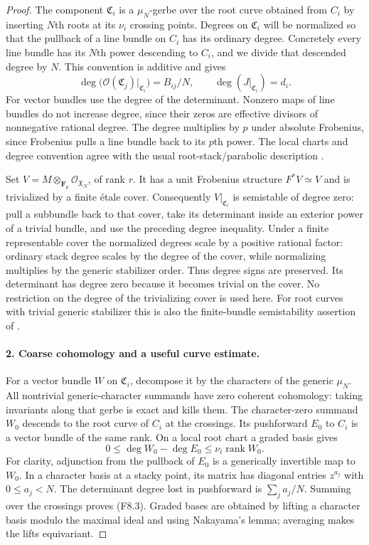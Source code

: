 \begin{proof}
The component $\mathfrak C_i$ is a $\mu_N$-gerbe over the root
curve obtained from $C_i$ by inserting $N$th roots at its $\nu_i$
crossing points. Degrees on $\mathfrak C_i$ will be normalized
so that the pullback of a line bundle on $C_i$ has its ordinary
degree. Concretely every line bundle has its $N$th power descending
to $C_i$, and we divide that descended degree by $N$. This convention
is additive and gives
\[
 \deg\bigl(\mathcal O(\mathfrak C_j)|_{\mathfrak C_i}\bigr)
        =B_{ij}/N,
 \qquad \deg(J|_{\mathfrak C_i})=d_i.
 \tag{F8.2}
\]
For vector bundles use the degree of the determinant. Nonzero
maps of line bundles do not increase degree, since their zeros
are effective divisors of nonnegative rational degree.
The degree multiplies by $p$ under absolute Frobenius, since
Frobenius pulls a line bundle back to its $p$th power.
The local charts and degree convention agree with the usual
root-stack/parabolic description
\cite[\S\S2.3--2.4]{Cadman2007}
\cite[Theorems 4--5, pp.~12,17]{Borne2007}.

Set $V=M\otimes_{\mathbf F_p}\mathcal O_{\mathfrak X_N}$, of rank $r$.
It has a unit Frobenius structure $F^*V\simeq V$ and is trivialized
by a finite \'etale cover. Consequently $V|_{\mathfrak C_i}$ is
semistable of degree zero: pull a subbundle back to that cover,
take its determinant inside an exterior power of a trivial bundle,
and use the preceding degree inequality. Under a finite representable
cover the normalized degrees scale by a positive rational factor:
ordinary stack degree scales by the degree of the cover, while
normalizing multiplies by the generic stabilizer order. Thus degree
signs are preserved. Its determinant has degree zero because it
becomes trivial on the cover. No restriction
on the degree of the trivializing cover is used here. For root curves with trivial generic stabilizer this is also
the finite-bundle semistability assertion of
\cite[Proposition 6, p.~22]{Borne2007}.

\paragraph{2. Coarse cohomology and a useful curve estimate.}
For a vector bundle $W$ on $\mathfrak C_i$, decompose it by the
characters of the generic $\mu_N$. All nontrivial generic-character
summands have zero coherent cohomology: taking invariants along
that gerbe is exact and kills them. The character-zero summand
$W_0$ descends to the root curve of $C_i$ at the crossings.
Its pushforward $E_0$ to $C_i$ is a vector bundle of the same rank.
On a local root chart a graded basis gives
\[
 0\leq \deg W_0-\deg E_0\leq\nu_i\operatorname{rank}W_0.
 \tag{F8.3}
\]
For clarity, adjunction from the pullback of $E_0$ is a generically
invertible map to $W_0$. In a character basis at a stacky point,
its matrix has diagonal entries $z^{a_j}$ with $0\leq a_j<N$.
The determinant degree lost in pushforward is $\sum_j a_j/N$.
Summing over the crossings proves (F8.3). Graded bases are obtained
by lifting a character basis modulo the maximal ideal and using
Nakayama's lemma; averaging makes the lifts equivariant.


\end{proof}
